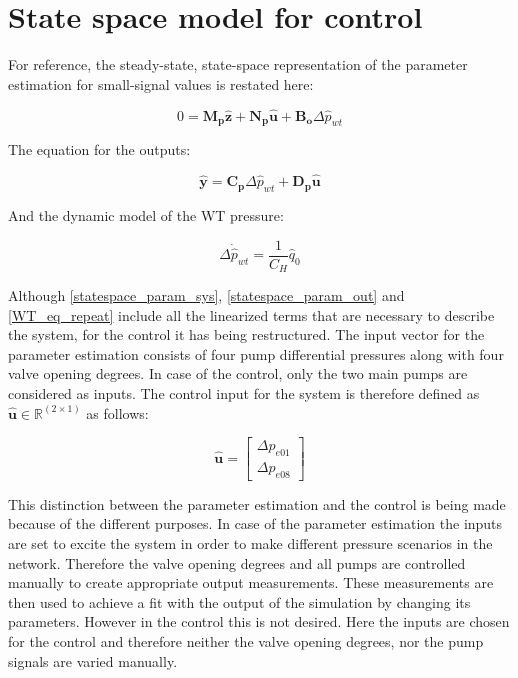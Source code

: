 \section{State space model for control}
 \label{SystemLin_control}
 
For reference, the steady-state, state-space representation of the parameter estimation for small-signal values is restated here:
 
 \begin{equation}
 0 = \bm{M_p} \bm{\hat{z}} + \bm{N_p} \bm{\hat{u}} + \bm{B_o} \Delta \hat{p}_{wt}    
 \label{statespace_param_sys}
\end{equation}

The equation for the outputs:

\begin{equation}
  \bm{\hat{y}} = \bm{C_p} \Delta \hat{p}_{wt} + \bm{D_p} \bm{\hat{u}} 
   \label{statespace_param_out}
\end{equation}

And the dynamic model of the WT pressure:

\begin{equation}
\Delta \dot{\hat{p}}_{wt} = \frac{1}{C_H} \hat{q}_0
 \label{WT_eq_repeat}
\end{equation}

Although \eqref{statespace_param_sys}, \eqref{statespace_param_out} and \eqref{WT_eq_repeat} include all the linearized terms that are necessary to describe the system, for the control it has being restructured. The input vector for the parameter estimation consists of four pump differential pressures along with four valve opening degrees. In case of the control, only the two main pumps are considered as inputs. The control input for the system is therefore defined as $\bm{\hat{u}} \in \pmb{\mathbb{R}}^{(2 \times 1)}$ as follows: 

\begin{equation}
\bm{\hat{u}} =
\begin{bmatrix} 
\Delta p_{e01} \\
\Delta p_{e08} 
\label{inputvector_control}
\end{bmatrix} 
\end{equation}

This distinction between the parameter estimation and the control is being made because of the different purposes. In case of the parameter estimation the inputs are set to excite the system in order to make different pressure scenarios in the network. Therefore the valve opening degrees and all pumps are controlled manually to create appropriate output measurements. These measurements are then used to achieve a fit with the output of the simulation by changing its parameters. However in the control this is not desired. Here the inputs are chosen for the control and therefore neither the valve opening degrees, nor the pump signals are varied manually. 

